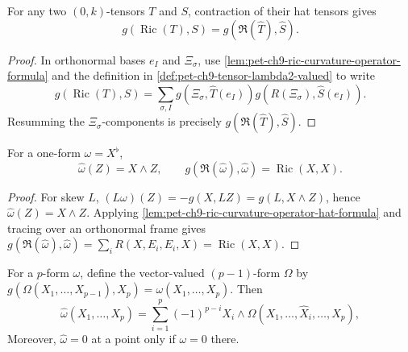 \begin{lemma}
  \label{lem:pet-ch9-ric-curvature-operator-hat-formula}
  For any two $(0,k)$-tensors $T$ and $S$, contraction of their hat tensors
  gives
  \[
    g(\operatorname{Ric}(T),S)=g(\mathfrak R(\hat T),\hat S).
  \]
\end{lemma}
\begin{proof}
  \sketch
  In orthonormal bases \(e_I\) and \(\Xi_\sigma\), use
  \cref{lem:pet-ch9-ric-curvature-operator-formula} and the definition in
  \cref{def:pet-ch9-tensor-lambda2-valued} to write
  \[
    g(\operatorname{Ric}(T),S)
      =\sum_{\sigma,I}g(\Xi_\sigma,\hat T(e_I))
        g(R(\Xi_\sigma),\hat S(e_I)).
  \]
  Resumming the \(\Xi_\sigma\)-components is precisely
  \(g(\mathfrak R(\hat T),\hat S)\).
\end{proof}

\begin{proposition}
  \label{prop:pet-ch9-1form-hat-ricci}
  For a one-form $\omega=X^\flat$,
  \[
    \hat\omega(Z)=X\wedge Z,
    \qquad
    g(\mathfrak R(\hat\omega),\hat\omega)=\operatorname{Ric}(X,X).
  \]
\end{proposition}
\begin{proof}
  \sketch
  For skew \(L\),
  \((L\omega)(Z)=-g(X,LZ)=g(L,X\wedge Z)\), hence
  \(\hat\omega(Z)=X\wedge Z\).  Applying
  \cref{lem:pet-ch9-ric-curvature-operator-hat-formula} and tracing over an
  orthonormal frame gives
  \(g(\mathfrak R(\hat\omega),\hat\omega)=
    \sum_iR(X,E_i,E_i,X)=\operatorname{Ric}(X,X)\).
\end{proof}

\begin{remark}
  \label{rem:pet-ch9-pform-hat-formula}
  For a $p$-form $\omega$, define the vector-valued $(p-1)$-form $\Omega$ by
  \(g(\Omega(X_1,\dots,X_{p-1}),X_p)=\omega(X_1,\dots,X_p)\).  Then
  \[
    \hat\omega(X_1,\dots,X_p)=\sum_{i=1}^p(-1)^{p-i}X_i\wedge
    \Omega(X_1,\dots,\hat X_i,\dots,X_p),
  \]
  Moreover, $\hat\omega=0$ at a point only if $\omega=0$ there.
\end{remark}

